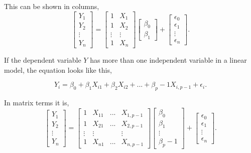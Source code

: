 \noindent This can be shown in columns,
\begin{equation}
\left[
\begin{array}{c}
	Y_1 \\ 
	Y_2 \\ 
	\vdots \\
	Y_n 
\end{array}
\right]
=
\left[
\begin{array}{cc}
	1 & X_1 \\ 
	1 & X_2 \\ 
	\vdots & \vdots \\
	1 & X_n
\end{array}
\right]
\left[
\begin{array}{c}
	\beta_0 \\ 
	\beta_1 
\end{array}
\right]
+
\left[
\begin{array}{c}
	\epsilon_0 \\ 
	\epsilon_1 \\
	\vdots \\
	\epsilon_n 
\end{array}
\right].
\end{equation}

\noindent If the dependent variable $Y$ has more than one independent variable in a linear model, the equation looks like this, 

\begin{equation} Y_i = \beta_0 + \beta_1 X_{i1} + \beta_2 X_{i2} + ... + \beta_p-1 X_{i, p-1} + \epsilon_i .
\end{equation}

\noindent In matrix terms it is,  
\begin{equation}
\left[
\begin{array}{c}
	Y_1 \\ 
	Y_2 \\ 
	\vdots \\
	Y_n 
\end{array}
\right]
=
\left[
\begin{array}{cccc}
	1 & X_{11} & ... & X_{1, p-1} \\ 
	1 & X_{21} & ... & X_{2, p-1} \\ 
	\vdots & \vdots &  & \vdots \\
	1 & X_{n1} & ... & X_{n, p-1}
\end{array}
\right]
\left[
\begin{array}{c}
	\beta_0 \\ 
	\beta_1 \\
	\vdots \\
	\beta_p-1 
\end{array}
\right]
+
\left[
\begin{array}{c}
	\epsilon_0 \\ 
	\epsilon_1 \\
	\vdots \\
	\epsilon_n 
\end{array}
\right].
\end{equation}

